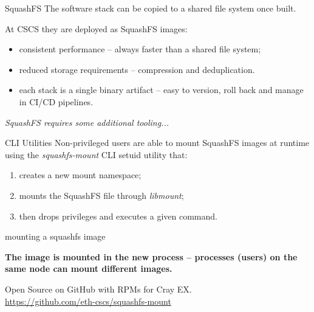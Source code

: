 \documentclass[aspectratio=43]{beamer}
\begin{document}
\begin{frame}[fragile]{SquashFS}
    The software stack can be copied to a shared file system once built.

    \vspace{20pt}

    At CSCS they are deployed as SquashFS images:
    \begin{itemize}
        \item consistent performance -- always faster than a shared file system;
        \item reduced storage requirements -- compression and deduplication.
        \item each stack is a single binary artifact -- easy to version, roll back and manage in CI/CD pipelines.
    \end{itemize}

    \vspace{20pt}

    \begin{center}
    \emph{SquashFS requires some additional tooling...}
    \end{center}
\end{frame}

\begin{frame}[fragile]{CLI Utilities}
    Non-privileged users are able to mount SquashFS images at runtime using the \emph{squashfs-mount} CLI setuid utility that:
    \begin{enumerate}
    \item creates a new mount namespace;
    \item mounts the SquashFS file through \emph{libmount};
    \item then drops privileges and executes a given command.
    \end{enumerate}

    \begin{code}{mounting a squashfs image}

    \end{code}

    \begin{center}
        \textbf{The image is mounted in the new process -- processes (users) on the same node can mount different images.}
    \end{center}

    \vspace{10pt}

    Open Source on GitHub with RPMs for Cray EX.\\\url{https://github.com/eth-cscs/squashfs-mount}
\end{frame}
\end{document}
